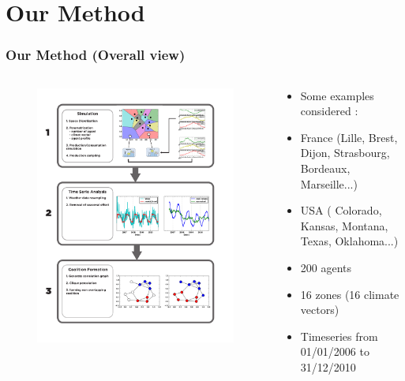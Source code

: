 \documentclass[xcolor=dvipsnames]{beamer}
\begin{document}
%
%
\section{Our Method}
\begin{frame}
	\frametitle{Our Method (Overall view)}
	
	\begin{columns}
		\begin{column}{.6 \linewidth}
			\begin{figure}
				\includegraphics[scale=.3]{Fig2.pdf}
			\end{figure}
		\end{column}
		\begin{column}{.4 \linewidth}
			\begin{itemize}
				\item {\footnotesize Some examples considered :}
				\item {\footnotesize France (Lille, Brest, Dijon, Strasbourg, Bordeaux, Marseille...)}
				\item {\footnotesize USA ( Colorado, Kansas, Montana, Texas, Oklahoma...)}
			\end{itemize}
			\begin{itemize}
				\item {\footnotesize 200 agents}
				\item {\footnotesize 16 zones (16 climate vectors)}
				\item {\footnotesize Timeseries from 01/01/2006 to 31/12/2010}
			\end{itemize}
		\end{column}
	\end{columns}


\end{frame}
\end{document}
